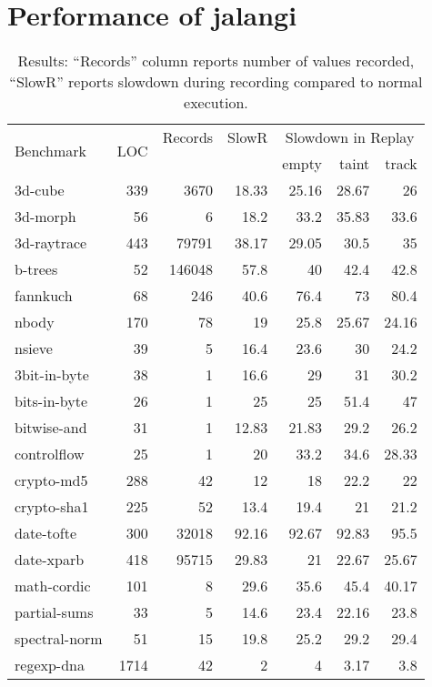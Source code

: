 \documentclass{sig-alternate}
\begin{document}
\vspace*{-2ex}
\section{Performance of  jalangi}
\label{sec:performance-jalangi}

\begin{table}
\caption{Results: ``Records'' column reports number of values
  recorded, ``SlowR'' reports
  slowdown during recording compared to normal execution.}
\label{tab:results}
{\scriptsize
\begin{center}
\begin{tabular}{|l|r|r|r|r|r|r|} \hline
\multirow{2}{*}{Benchmark} & \multirow{2}{*}{LOC} & \scriptsize{Records} & \scriptsize{SlowR} &
\multicolumn{3}{|c|}{\scriptsize{ Slowdown in Replay}}\\
& & & & empty & taint & track \\
\hline
3d-cube & 339 & 3670 & 18.33  & 25.16 & 28.67 & 26 \\
3d-morph& 56 & 6 & 18.2 & 33.2 & 35.83 & 33.6 \\
3d-raytrace& 443 & 79791 & 38.17 & 29.05 & 30.5 & 35\\
b-trees& 52 & 146048 & 57.8 & 40 & 42.4 & 42.8\\
fannkuch& 68 & 246 & 40.6 & 76.4 & 73 & 80.4 \\
nbody& 170 & 78 & 19 & 25.8& 25.67 & 24.16\\
nsieve& 39 & 5 & 16.4 & 23.6 & 30 & 24.2\\
3bit-in-byte& 38 & 1 & 16.6& 29 & 31 & 30.2 \\
bits-in-byte& 26 & 1 & 25 & 25 & 51.4 & 47 \\
bitwise-and& 31 & 1 & 12.83 & 21.83 & 29.2 & 26.2\\
controlflow& 25 & 1 & 20 & 33.2 & 34.6 & 28.33\\
crypto-md5& 288 & 42 & 12 & 18 & 22.2 & 22\\
crypto-sha1& 225 & 52 & 13.4& 19.4 & 21 & 21.2\\
date-tofte& 300 & 32018 & 92.16 & 92.67 & 92.83 & 95.5\\
date-xparb& 418 & 95715 & 29.83 & 21 & 22.67 & 25.67\\
math-cordic& 101 & 8 & 29.6 & 35.6 & 45.4 & 40.17\\
partial-sums& 33 & 5 & 14.6 & 23.4 & 22.16& 23.8\\
spectral-norm& 51 & 15 & 19.8& 25.2 & 29.2 & 29.4\\
regexp-dna& 1714 & 42 &2 & 4 & 3.17 & 3.8\\

\end{tabular}
\end{center}}
\end{table}
\end{document}
